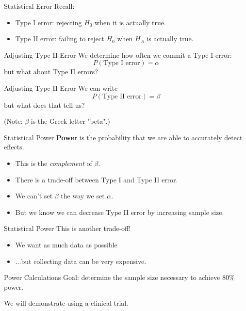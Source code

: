 \begin{frame}{Statistical Error}
    Recall:
    \begin{itemize}
        \item Type I error: rejecting $H_0$ when it is actually true.
        \item Type II error: failing to reject $H_0$ when $H_A$ is actually true.
    \end{itemize}
\end{frame}

\begin{frame}{Adjusting Type II Error}
    We determine how often we commit a Type I error:
    \[
        P(\text{Type I error}) = \alpha
    \]
    but what about Type II errors?
\end{frame}

\begin{frame}{Adjusting Type II Error}
    We can write
    \[
        P(\text{Type II error}) = \beta
    \]
    but what does that tell us?
    
    \vspace{24pt}
    (Note: $\beta$ is the Greek letter "beta".)
\end{frame}

\begin{frame}{Statistical Power}
    \textbf{Power} is the probability that we are able to accurately detect effects.
    \begin{itemize}
        \item This is the \textit{complement} of $\beta$.
        \item There is a trade-off between Type I and Type II error.
        \item We can't set $\beta$ the way we set $\alpha$.
        \item But we know we can decrease Type II error by increasing sample size.
    \end{itemize}
\end{frame}

\begin{frame}{Statistical Power}
    This is another trade-off!
    \begin{itemize}
        \item We want as much data as possible
        \item ...but collecting data can be very expensive.
    \end{itemize}
\end{frame}

\begin{frame}{Power Calculations}
    Goal: determine the sample size necessary to achieve 80\% power.
    
    \vspace{24pt}We will demonstrate using a clinical trial.
\end{frame}

